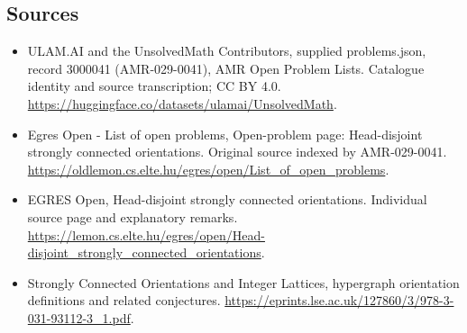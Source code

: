 \documentclass[11pt,a4paper]{article}
\begin{document}
\subsection{Sources}
\begin{itemize}
\item[S1] ULAM.AI and the UnsolvedMath Contributors, supplied problems.json, record 3000041 (AMR-029-0041), AMR Open Problem Lists. Catalogue identity and source transcription; CC BY 4.0.
\url{https://huggingface.co/datasets/ulamai/UnsolvedMath}.
\item[S2] Egres Open - List of open problems, Open-problem page: Head-disjoint strongly connected orientations. Original source indexed by AMR-029-0041.
\url{https://oldlemon.cs.elte.hu/egres/open/List_of_open_problems}.
\item[S3] EGRES Open, Head-disjoint strongly connected orientations. Individual source page and explanatory remarks.
\url{https://lemon.cs.elte.hu/egres/open/Head-disjoint_strongly_connected_orientations}.
\item[S4] Strongly Connected Orientations and Integer Lattices, hypergraph orientation definitions and related conjectures.
\url{https://eprints.lse.ac.uk/127860/3/978-3-031-93112-3_1.pdf}.
\end{itemize}
\end{document}
